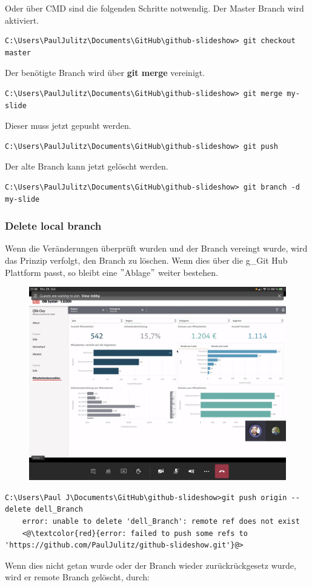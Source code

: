 Oder über \gls{CMD} sind die folgenden Schritte notwendig.
Der Master Branch wird aktiviert. 
\begin{lstlisting}[style=CMD]
	C:\Users\PaulJulitz\Documents\GitHub\github-slideshow> git checkout master
\end{lstlisting}
Der benötigte Branch wird über \textbf{git merge} vereinigt.
\begin{lstlisting}[style=CMD]
	C:\Users\PaulJulitz\Documents\GitHub\github-slideshow> git merge my-slide
\end{lstlisting}
Dieser muss jetzt gepusht werden.
\begin{lstlisting}[style=CMD]
	C:\Users\PaulJulitz\Documents\GitHub\github-slideshow> git push
\end{lstlisting}
Der alte Branch kann jetzt gelöscht werden.
\begin{lstlisting}[style=CMD]
	C:\Users\PaulJulitz\Documents\GitHub\github-slideshow> git branch -d my-slide
\end{lstlisting}

\subsubsection{Delete local branch}
Wenn die Veränderungen überprüft wurden und der Branch vereingt wurde, wird das Prinzip verfolgt, den Branch zu löschen. 
Wenn dies über die \gls{g_Git} Hub Plattform passt, so bleibt eine $"$Ablage$"$ weiter bestehen.
\begin{figure}[H]
	\centering
	\includegraphics[width=0.7\linewidth]{attachment/chapter_6/Scc007}
\end{figure}
\begin{lstlisting}[style=CMD]
	C:\Users\Paul J\Documents\GitHub\github-slideshow>git push origin --delete dell_Branch
	error: unable to delete 'dell_Branch': remote ref does not exist
	<@\textcolor{red}{error: failed to push some refs to 'https://github.com/PaulJulitz/github-slideshow.git'}@>
\end{lstlisting}
Wenn dies nicht getan wurde oder der Branch wieder zurückrückgesetz wurde, wird er remote Branch gelöscht, durch: 

